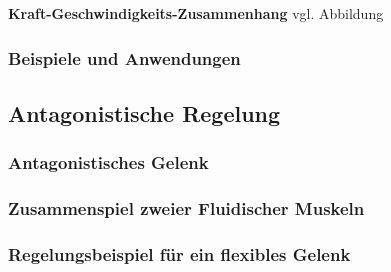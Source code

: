 \textbf{Kraft-Geschwindigkeits-Zusammenhang}
vgl. Abbildung
\subsubsection{Beispiele und Anwendungen}
\subsection{Antagonistische Regelung}
\subsubsection{Antagonistisches Gelenk}
\subsubsection{Zusammenspiel zweier Fluidischer Muskeln}
\subsubsection{Regelungsbeispiel für ein flexibles Gelenk}
